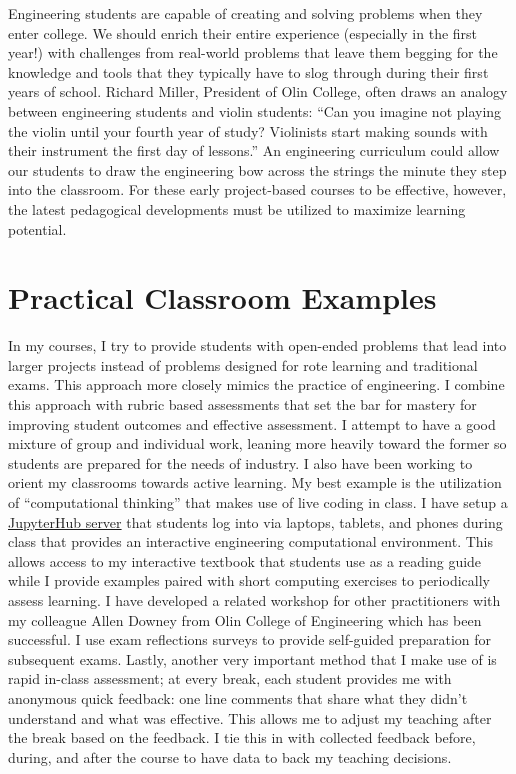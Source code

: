 \documentclass{article}
\begin{document}
Engineering students are capable of creating and solving problems when they
enter college. We should enrich their entire experience (especially in the first
year!) with challenges from real-world problems that leave them begging for the
knowledge and tools that they typically have to slog through during their first
years of school. Richard Miller, President of Olin College, often draws an
analogy between engineering students and violin students: ``Can you imagine not
playing the violin until your fourth year of study? Violinists start making
sounds with their instrument the first day of lessons.'' An engineering
curriculum could allow our students to draw the engineering bow across the
strings the minute they step into the classroom. For these early project-based
courses to be effective, however, the latest pedagogical developments must be
utilized to maximize learning potential.

\section*{Practical Classroom Examples}
%
In my courses, I try to provide students with open-ended problems that lead
into larger projects instead of problems designed for rote learning and
traditional exams. This approach more closely mimics the practice of
engineering. I combine this approach with rubric based assessments that set the
bar for mastery for improving student outcomes and effective assessment. I
attempt to have a good mixture of group and individual work, leaning more
heavily toward the former so students are prepared for the needs of industry. I
also have been working to orient my classrooms towards active learning. My best
example is the utilization of ``computational thinking'' that makes use of live
coding in class. I have setup a
\href{https://jupyter.libretexts.org}{JupyterHub server} that students log into
via laptops, tablets, and phones during class that provides an interactive
engineering computational environment. This allows access to my interactive
textbook that students use as a reading guide while I provide examples paired
with short computing exercises to periodically assess learning. I have
developed a related workshop for other practitioners with my colleague Allen
Downey from Olin College of Engineering which has been successful. I use exam
reflections surveys to provide self-guided preparation for subsequent exams.
Lastly, another very important method that I make use of is rapid in-class
assessment; at every break, each student provides me with anonymous quick
feedback: one line comments that share what they didn't understand and what was
effective.  This allows me to adjust my teaching after the break based on the
feedback. I tie this in with collected feedback before, during, and after the
course to have data to back my teaching decisions.
\end{document}
